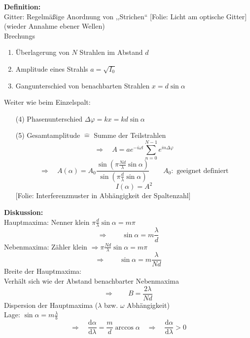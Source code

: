 \documentclass[titlepage,11pt,a4paper,ngerman]{report}
\newcommand{\tx}[1]{\textrm{#1}}
\newcommand{\dd}{\tx{d}}
\newcommand{\folie}[1]{\color{gray}[Folie: #1]\color{black}}
\begin{document}
\textbf{Definition:}\\
Gitter: Regelmäßige Anordnung von ,,Strichen``
\folie{Licht am optische Gitter} (wieder Annahme ebener Wellen)\\
Brechungs
\begin{enumerate}[(1)]
	\item Überlagerung von $ N $ Strahlen im Abstand $ d $
	\item Amplitude eines Strahls $ a = \sqrt{I_0} $
	\item Gangunterschied von benachbarten Strahlen $ x = d \sin \alpha $
\end{enumerate}	
Weiter wie beim Einzelspalt:
\begin{enumerate}[(4)]
	\item[(4)] Phasenunterschied $ \Delta \varphi = k x = k d \sin \alpha $
	\item[(5)] Gesamtamplitude $ \widehat{=} $ Summe der Teilstrahlen
	\begin{equation*}
	\Rightarrow \quad A = a e^{-i \omega t} \sum_{n=0}^{N-1} e^{i n \Delta \varphi}
	\end{equation*}
	\begin{equation*}
	\Rightarrow \quad A(\alpha) = A_0 \frac{\sin \left(\pi \frac{N d}{\lambda} \sin \alpha \right)}{\sin \left( \pi \frac{d}{\lambda} \sin \alpha \right)} \qquad A_0: \tx{ geeignet definiert}
	\end{equation*}
	\begin{equation*}
	I(\alpha) = A^2
	\end{equation*}
	\folie{Interferenzmuster in Abhängigkeit der Spaltenzahl}
\end{enumerate}
\textbf{Diskussion:}\\[5pt]
Hauptmaxima: Nenner klein $ \pi \frac{d}{\lambda} \sin \alpha = m \pi $
\begin{equation*}
\Rightarrow \qquad \sin \alpha = m \frac{\lambda}{d}
\end{equation*}
Nebenmaxima: Zähler klein $ \Rightarrow \pi \frac{N d}{\lambda} \sin \alpha = m \pi $
\begin{equation*}
\Rightarrow \qquad \sin \alpha = m \frac{\lambda}{N d}
\end{equation*}
Breite der Hauptmaxima:\\
Verhält sich wie der Abstand benachbarter Nebenmaxima
\begin{equation*}
\Rightarrow \qquad B = \frac{2 \lambda}{N d}
\end{equation*}
Dispersion der Hauptmaxima ($ \lambda $ bzw. $ \omega $ Abhängigkeit)\\
Lage: $ \sin \alpha = m \frac{\lambda}{b} $
\begin{equation*}
\Rightarrow \quad \frac{\dd \alpha}{\dd \lambda} = \frac{m}{d} \arccos \alpha \quad \Rightarrow \quad \frac{\dd \alpha}{\dd \lambda} > 0
\end{equation*}
\end{document}

